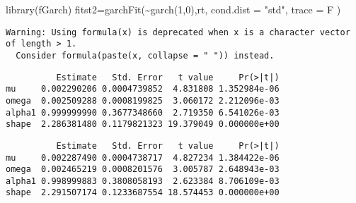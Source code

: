 \documentclass[
  ignorenonframetext,
]{beamer}
\newenvironment{Shaded}{\begin{snugshade}}{\end{snugshade}}
\newcommand{\AttributeTok}[1]{\textcolor[rgb]{0.77,0.63,0.00}{#1}}
\newcommand{\CommentTok}[1]{\textcolor[rgb]{0.56,0.35,0.01}{\textit{#1}}}
\newcommand{\DecValTok}[1]{\textcolor[rgb]{0.00,0.00,0.81}{#1}}
\newcommand{\FunctionTok}[1]{\textcolor[rgb]{0.00,0.00,0.00}{#1}}
\newcommand{\NormalTok}[1]{#1}
\newcommand{\OtherTok}[1]{\textcolor[rgb]{0.56,0.35,0.01}{#1}}
\newcommand{\SpecialCharTok}[1]{\textcolor[rgb]{0.00,0.00,0.00}{#1}}
\newcommand{\StringTok}[1]{\textcolor[rgb]{0.31,0.60,0.02}{#1}}
\begin{document}
\begin{frame}[fragile]
\begin{Shaded}
\begin{Highlighting}[]
\FunctionTok{library}\NormalTok{(fGarch)}
\NormalTok{fitst2}\OtherTok{=}\FunctionTok{garchFit}\NormalTok{(}\SpecialCharTok{\textasciitilde{}}\FunctionTok{garch}\NormalTok{(}\DecValTok{1}\NormalTok{,}\DecValTok{0}\NormalTok{),rt, }\AttributeTok{cond.dist =} \StringTok{"std"}\NormalTok{, }\AttributeTok{trace =}\NormalTok{ F )}
\end{Highlighting}
\end{Shaded}

\begin{verbatim}
Warning: Using formula(x) is deprecated when x is a character vector of length > 1.
  Consider formula(paste(x, collapse = " ")) instead.
\end{verbatim}

\begin{Shaded}
\end{Shaded}

\begin{verbatim}
          Estimate   Std. Error   t value     Pr(>|t|)
mu     0.002290206 0.0004739852  4.831808 1.352984e-06
omega  0.002509288 0.0008199825  3.060172 2.212096e-03
alpha1 0.999999990 0.3677348660  2.719350 6.541026e-03
shape  2.286381480 0.1179821323 19.379049 0.000000e+00
\end{verbatim}

\begin{Shaded}
\end{Shaded}

\begin{verbatim}
          Estimate   Std. Error   t value     Pr(>|t|)
mu     0.002287490 0.0004738717  4.827234 1.384422e-06
omega  0.002465219 0.0008201576  3.005787 2.648943e-03
alpha1 0.998999883 0.3808058193  2.623384 8.706109e-03
shape  2.291507174 0.1233687554 18.574453 0.000000e+00
\end{verbatim}
\end{frame}
\end{document}
